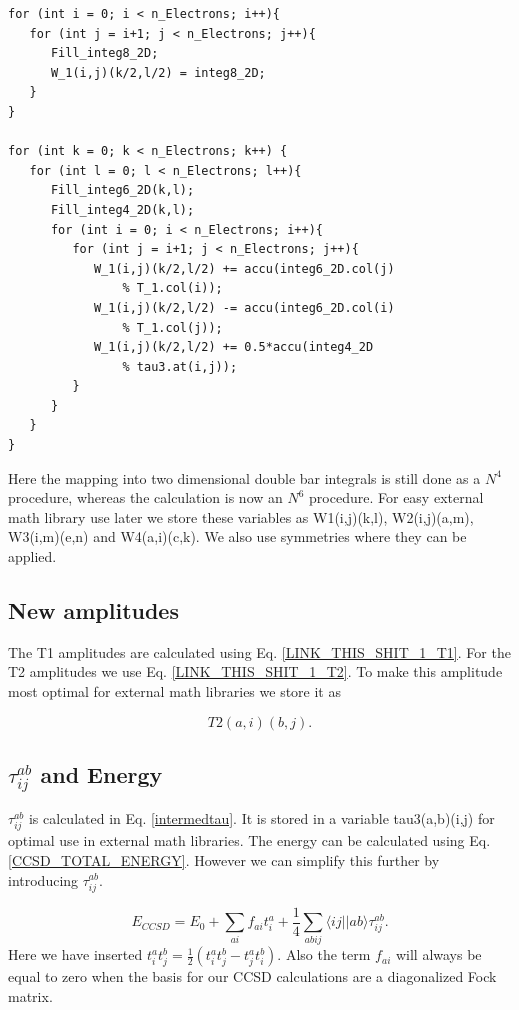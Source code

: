 \documentclass[a4paper,norsk,11pt,twoside]{report}
\begin{document}
\begin{lstlisting}
for (int i = 0; i < n_Electrons; i++){
   for (int j = i+1; j < n_Electrons; j++){
      Fill_integ8_2D;
      W_1(i,j)(k/2,l/2) = integ8_2D;
   }
}

for (int k = 0; k < n_Electrons; k++) {
   for (int l = 0; l < n_Electrons; l++){      
      Fill_integ6_2D(k,l);
      Fill_integ4_2D(k,l);
      for (int i = 0; i < n_Electrons; i++){
         for (int j = i+1; j < n_Electrons; j++){
            W_1(i,j)(k/2,l/2) += accu(integ6_2D.col(j)
                % T_1.col(i));
            W_1(i,j)(k/2,l/2) -= accu(integ6_2D.col(i)
                % T_1.col(j));
            W_1(i,j)(k/2,l/2) += 0.5*accu(integ4_2D
                % tau3.at(i,j));
         }
      }
   }
}
\end{lstlisting}

Here the mapping into two dimensional double bar integrals is still done as a $N^4$ procedure, whereas the calculation is now an $N^6$ procedure. For easy external math library use later we store these variables as W1(i,j)(k,l), W2(i,j)(a,m), W3(i,m)(e,n) and W4(a,i)(c,k). We also use symmetries where they can be applied.

\subsection{New amplitudes}
The T1 amplitudes are calculated using Eq. \eqref{LINK_THIS_SHIT_1_T1}. For the T2 amplitudes we use Eq. \eqref{LINK_THIS_SHIT_1_T2}. To make this amplitude most optimal for external math libraries we store it as

\begin{equation}
T2(a,i)(b,j) . \label{howtostoret2}
\end{equation}

\subsection{$\tau_{ij}^{ab}$ and Energy}
$\tau_{ij}^{ab}$ is calculated in Eq. \eqref{intermedtau}. It is stored in a variable tau3(a,b)(i,j) for optimal use in external math libraries. The energy can be calculated using Eq. \eqref{CCSD_TOTAL_ENERGY}. However we can simplify this further by introducing $\tau_{ij}^{ab}$.

\begin{equation}
E_{CCSD} = E_0 + \sum_{ai} f_{ai} t_i^a + \frac{1}{4} \sum_{abij} \langle ij || ab \rangle \tau_{ij}^{ab} .
\end{equation}
Here we have inserted $t_i^a t_j^b = \frac{1}{2} \left( t_i^a t_j^b - t_j^a t_i^b \right)$. Also the term $f_{ai}$ will always be equal to zero when the basis for our CCSD calculations are a diagonalized Fock matrix.
\end{document}
